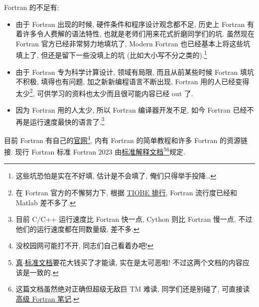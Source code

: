 Fortran 的不足有:
\begin{itemize}
    \item 由于 Fortran 出现的时候, 硬件条件和程序设计观念都不足, 历史上 Fortran 有着许多令人费解的语法特性, 也就是老师们用来花式折磨同学们的坑. 虽然现在 Fortran 官方已经非常努力地填坑了, Modern Fortran 也已经基本上将这些坑填上了, 但还是留下一些没填上的坑 (比如大小写不分之类的).\footnote{这些坑恐怕是实在不好填, 估计是不会填了, 俺们只得举手投降\dots{}}
    \item 由于 Fortran 专为科学计算设计, 领域有局限, 而且从前某些时候 Fortran 填坑不积极, 填得也有问题, 加之新新编程语言不断出现, Fortran 用的人已经变得太少\footnote{在 Fortran 官方的不懈努力下, 根据 \href{https://www.tiobe.com/tiobe-index/}{TIOBE 排行}, Fortran 流行度已经和 Matlab 差不多了.}, 可供学习的资料也太少而且很可能内容已经 out 了.
    \item 因为 Fortran 用的人太少, 所以 Fortran 编译器开发不足, 如今 Fortran 已经不再是运行速度最快的语言了.\footnote{目前 C/C++ 运行速度比 Fortran 快一点, Cython 则比 Fortran 慢一点, 不过他们的运行速度都在同数量级, 差不多.}
\end{itemize}

目前 Fortran 有自己的\href{https://fortran-lang.org/}{官网}\footnote{没校园网可能打不开, 同志们自己看着办吧!}, 内有 Fortran 的简单教程和许多 Fortran 的资源链接. 现行 Fortran 标准 Fortran 2023 由\href{https://j3-fortran.org/doc/year/24/24-007.pdf}{标准解释文档}\footnote{\href{https://www.iso.org/standard/82170.html}{真$\cdot$标准文档}要花大钱买了才能读, 实在是太可恶啦! 不过这两个文档的内容应该是一致的.}\footnote{这篇文档虽然绝对正确但超级无敌巨 TM 难读, 同学们还是别碰了, 可直接读\href{https://github.com/GasinAn/AdvForNotes}{高级 Fortran 笔记}.}规定.
